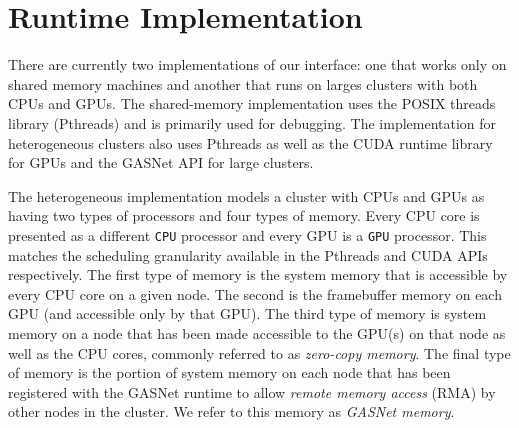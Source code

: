 
\section{Runtime Implementation}
\label{sec:impl}

There are currently two implementations of our interface:
one that works only on shared memory machines and another that
runs on larges clusters with both CPUs and GPUs.  The shared-memory
implementation uses the POSIX threads library\cite{PTHREADS} (Pthreads)
and is primarily used for debugging.
The implementation for heterogeneous clusters also uses Pthreads as 
well as the CUDA runtime library for GPUs\cite{CUDA} and the GASNet
API for large clusters\cite{GASNET07}.  

The heterogeneous implementation
models a cluster with CPUs and GPUs as having two types of processors 
and four types of memory.  Every CPU core is presented as a different {\tt CPU} processor
and every GPU is a {\tt GPU} processor.  This matches the scheduling granularity available
in the Pthreads and CUDA APIs respectively.  The first type of memory is the 
system memory that is accessible by every CPU core on a given node.  The second is the 
framebuffer memory on each GPU (and accessible only by that GPU).  The third type
of memory is system memory on a node that has been made accessible to the GPU(s) on
that node as well as the CPU cores, commonly referred to as {\em zero-copy memory}.
The final type of memory is the portion of system memory on each node that has been registered with
the GASNet runtime to allow {\em remote memory access} (RMA) by other nodes in the cluster.
We refer to this memory as {\em GASNet memory}.

